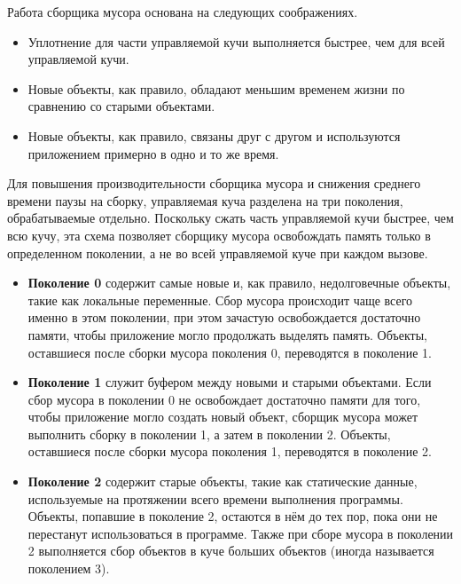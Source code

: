Работа сборщика мусора основана на следующих соображениях.~\cite{dotnet_gc}

\begin{itemize}[label*=---]
	\item Уплотнение для части управляемой кучи выполняется быстрее, чем для всей управляемой кучи.
	\item Новые объекты, как правило, обладают меньшим временем жизни по сравнению со старыми объектами.
	\item Новые объекты, как правило, связаны друг с другом и используются приложением примерно в одно и то же время.
\end{itemize}

Для повышения производительности сборщика мусора и снижения среднего времени паузы на сборку, управляемая куча разделена на три поколения, обрабатываемые отдельно. Поскольку сжать часть управляемой кучи быстрее, чем всю кучу, эта схема позволяет сборщику мусора освобождать память только в определенном поколении, а не во всей управляемой куче при каждом вызове.~\cite{dotnet_gc}~\cite{dotnet_memory}

\begin{itemize}[label*=---]
	\item \textbf{Поколение 0} содержит самые новые и, как правило, недолговечные объекты, такие как локальные переменные. Сбор мусора происходит чаще всего именно в этом поколении, при этом зачастую освобождается достаточно памяти, чтобы приложение могло продолжать выделять память. Объекты, оставшиеся после сборки мусора поколения 0, переводятся в поколение 1.
	\item \textbf{Поколение 1} служит буфером между новыми и старыми объектами. Если сбор мусора в поколении 0 не освобождает достаточно памяти для того, чтобы приложение могло создать новый объект, сборщик мусора может выполнить сборку в поколении 1, а затем в поколении 2. Объекты, оставшиеся после сборки мусора поколения 1, переводятся в поколение 2.
	\item \textbf{Поколение 2} содержит старые объекты, такие как статические данные, используемые на протяжении всего времени выполнения программы. Объекты, попавшие в поколение 2, остаются в нём до тех пор, пока они не перестанут использоваться в программе. Также при сборе мусора в поколении 2 выполняется сбор объектов в куче больших объектов (иногда называется поколением 3).
\end{itemize}


